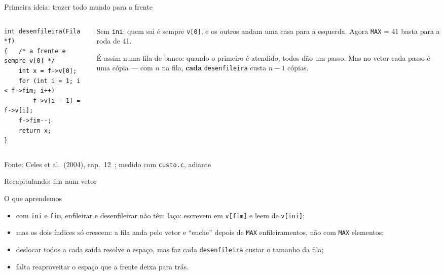 \documentclass[aspectratio=169]{beamer}
\newcommand{\fonte}[1]{\vfill\hfill{\scriptsize\textcolor{UFSGray}{Fonte: #1}}}
\begin{document}
\begin{frame}[fragile]{Primeira ideia: trazer todo mundo para a frente}
  \begin{columns}[c]
    \begin{column}{0.5\textwidth}
\begin{lstlisting}[style=codC]
int desenfileira(Fila *f)
{   /* a frente e sempre v[0] */
    int x = f->v[0];
    for (int i = 1; i < f->fim; i++)
        f->v[i - 1] = f->v[i];
    f->fim--;
    return x;
}
\end{lstlisting}
    \end{column}
    \begin{column}{0.46\textwidth}
      \small Sem \texttt{ini}: quem sai é sempre \texttt{v[0]}, e os outros
      andam uma casa para a esquerda. Agora \texttt{MAX} = 41 basta para a
      roda de 41.

      \medskip
      É assim numa fila de banco: quando o primeiro é atendido, todos dão
      um passo. Mas no vetor cada passo é uma cópia --- com $n$ na fila,
      \textbf{cada} \texttt{desenfileira} custa $n - 1$ cópias.
    \end{column}
  \end{columns}
  \fonte{Celes et al.\ (2004), cap.~12~\cite{celes2004introducao};
    medido com \texttt{custo.c}, adiante}
\end{frame}

\begin{frame}{Recapitulando: fila num vetor}
  \begin{block}{O que aprendemos}
    \begin{itemize}
      \item com \texttt{ini} e \texttt{fim}, enfileirar e desenfileirar não
        têm laço: escrevem em \texttt{v[fim]} e leem de \texttt{v[ini]};
      \item mas os dois índices só crescem: a fila anda pelo vetor e
        ``enche'' depois de \texttt{MAX} enfileiramentos, não com
        \texttt{MAX} elementos;
      \item deslocar todos a cada saída resolve o espaço, mas faz cada
        \texttt{desenfileira} custar o tamanho da fila;
      \item falta reaproveitar o espaço que a frente deixa para trás.
    \end{itemize}
  \end{block}
\end{frame}

\end{document}
